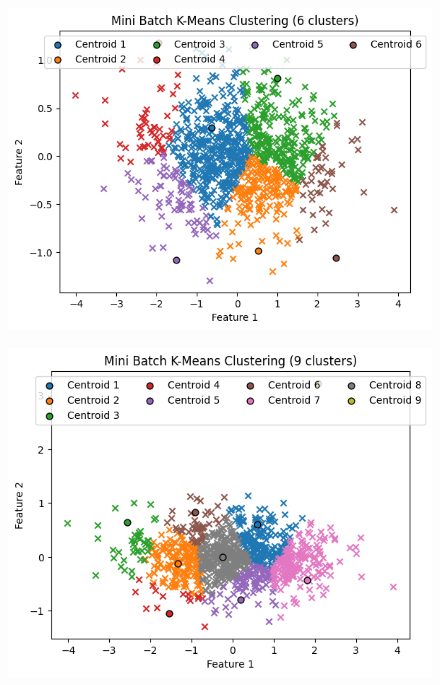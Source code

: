 \documentclass{template}
\begin{document}
\begin{figure}
\includegraphics[scale=0.7]{C3.png}
\caption{}
\label{fig:logo}
\end{figure}
\begin{figure}
\includegraphics[scale=0.7]{C4.png}
\caption{}
\label{fig:logo}
\end{figure}
\end{document}
